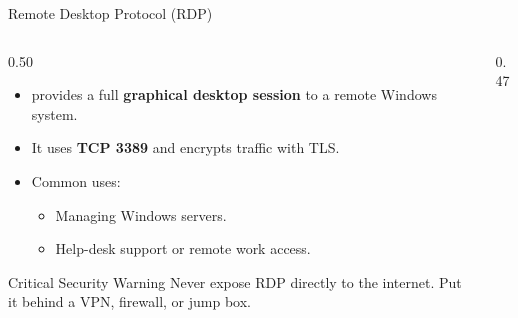 \documentclass[aspectratio=169]{beamer}  %
\begin{document}
\begin{frame}[t]{Remote Desktop Protocol (RDP)}
    \begin{columns}[T]
        \begin{column}{0.50\textwidth}
            \begin{itemize}
                \item {} provides a full \textbf{graphical desktop session} to a remote Windows system.
                \item It uses \textbf{TCP 3389} and encrypts traffic with TLS.
                \item Common uses:
                    \begin{itemize}
                        \footnotesize
                        \item Managing Windows servers.
                        \item Help-desk support or remote work access.
                    \end{itemize}
            \end{itemize}
            \vspace{0.3em}
            \begin{alertblock}{Critical Security Warning}
                \footnotesize Never expose RDP directly to the internet. Put it behind a VPN, firewall, or jump box.
            \end{alertblock}
        \end{column}
        \begin{column}{0.47\textwidth}
            \begin{center}
\end{center}
\end{column}
\end{columns}
\end{frame}
\end{document}

